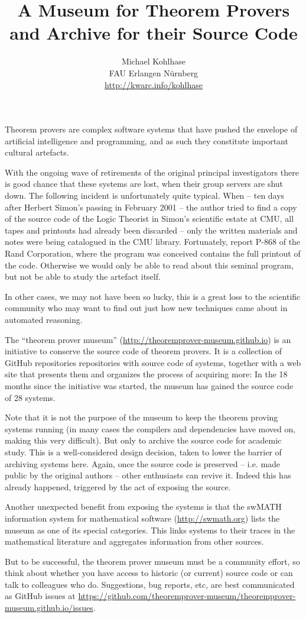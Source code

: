 \documentclass{article}
\title{A Museum for Theorem Provers\\ and Archive for their Source Code}
\author{Michael Kohlhase\\FAU Erlangen N\"urnberg\\\url{http://kwarc.info/kohlhase}}
\begin{document}
\maketitle

Theorem provers are complex software systems that have pushed the envelope of artificial
intelligence and programming, and as such they constitute important cultural
artefacts.

With the ongoing wave of retirements of the original principal investigators there is good
chance that these systems are lost, when their group servers are shut down. The following
incident is unfortunately quite typical. When -- ten days after Herbert Simon's passing in
February 2001 -- the author tried to find a copy of the source code of the Logic Theorist
in Simon's scientific estate at CMU, all tapes and printouts had already been discarded --
only the written materials and notes were being catalogued in the CMU
library. Fortunately, report P-868 of the Rand Corporation, where the program was
conceived contains the full printout of the code. Otherwise we would only be able to read
about this seminal program, but not be able to study the artefact itself.

In other cases, we may not have been so lucky, this is a great loss to the scientific
community who may want to find out just how new techniques came about in automated
reasoning.  

The ``theorem prover museum'' (\url{http://theoremprover-museum.github.io}) is an
initiative to conserve the source code of theorem provers. It is a collection of GitHub
repositories repositories with source code of systems, together with a web site that
presents them and organizes the process of acquiring more: In the 18 months since the
initiative was started, the museum has gained the source code of 28 systems.
 
Note that it is not the purpose of the museum to keep the theorem proving systems running
(in many cases the compilers and dependencies have moved on, making this very
difficult). But only to archive the source code for academic study.  This is a
well-considered design decision, taken to lower the barrier of archiving systems
here. Again, once the source code is preserved -- i.e. made public by the original authors
-- other enthusiasts can revive it. Indeed this has already happened, triggered by the act
of exposing the source.

Another unexpected benefit from exposing the systems is that the \textsf{swMATH}
information system for mathematical software (\url{http://swmath.org}) lists the museum as
one of its special categories. This links systems to their traces in the mathematical
literature and aggregates information from other sources.

But to be successful, the theorem prover museum must be a community effort, so think about
whether you have access to historic (or current) source code or can talk to colleagues who
do. Suggestions, bug reports, etc, are best communicated as GitHub issues at \url{https://github.com/theoremprover-museum/theoremprover-museum.github.io/issues}. 
\end{document}
